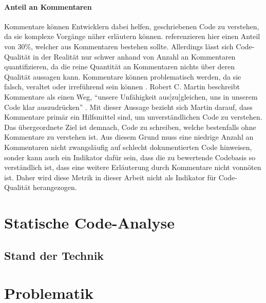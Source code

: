 \documentclass[a4paper, 12pt]{article}
\begin{document}
\paragraph{Anteil an Kommentaren}
Kommentare können Entwicklern dabei helfen, geschriebenen Code zu verstehen, da sie komplexe Vorgänge näher erläutern können. 
\textcite{Linda_softwarequality} referenzieren hier einen Anteil von 30\%, welcher aus Kommentaren bestehen sollte.
Allerdings lässt sich Code-Qualität in der Realität nur schwer anhand von Anzahl an Kommentaren quantifizieren, da die reine Quantität an Kommentaren nichts über deren Qualität aussagen kann.
Kommentare können problematisch werden, da sie falsch, veraltet oder irreführend sein können \parencites[85]{Martin2009}.
Robert C. Martin beschreibt Kommentare als einen Weg, \enquote{unsere Unfähigkeit aus[zu]gleichen, uns in unserem Code klar auszudrücken} \parencites[85]{Martin2009}.
Mit dieser Aussage bezieht sich Martin darauf, dass Kommentare primär ein Hilfsmittel sind, um unverständlichen Code zu verstehen.
Das übergeordnete Ziel ist demnach, Code zu schreiben, welche bestenfalls ohne Kommentare zu verstehen ist.
Aus diesem Grund muss eine niedrige Anzahl an Kommentaren nicht zwangsläufig auf schlecht dokumentierten Code hinweisen, sonder kann auch ein Indikator dafür sein, dass die zu bewertende Codebasis so verständlich ist, dass eine weitere Erläuterung durch Kommentare nicht vonnöten ist.
Daher wird diese Metrik in dieser Arbeit nicht als Indikator für Code-Qualität herangezogen.


\section{Statische Code-Analyse}
\subsection{Stand der Technik}
\blindtext

\section{Problematik}
\blindtext

\newpage
\printbibliography
\end{document}

